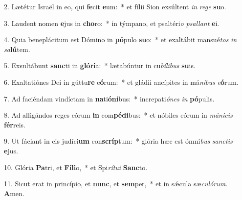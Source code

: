 2. Lætétur Israël in eo, qui \textbf{fe}cit \textbf{e}um:~*  et fílii Sion exsúltent \textit{in} \textit{re}\textit{ge} \textbf{su}o.\

3. Laudent nomen \textbf{e}jus in \textbf{cho}ro:~*  in týmpano, et psaltéri\textit{o} \textit{psal}\textit{lant} \textbf{e}i.\

4. Quia beneplácitum est Dómino in \textbf{pó}pulo \textbf{su}o:~*  et exaltábit mansué\textit{tos} \textit{in} \textit{sa}\textbf{lú}tem.\

5. Exsultábunt \textbf{sanc}ti in \textbf{gló}\textbf{ri}a:~*  lætabúntur in cu\textit{bí}\textit{li}\textit{bus} \textbf{su}is.\

6. Exaltatiónes Dei in gúttu\textbf{re} e\textbf{ó}rum:~*  et gládii ancípites in má\textit{ni}\textit{bus} \textit{e}\textbf{ó}rum.\

7. Ad faciéndam vindíctam in \textbf{na}ti\textbf{ó}\textbf{ni}bus:~*  increpati\textit{ó}\textit{nes} \textit{in} \textbf{pó}pulis.\

8. Ad alligándos reges eórum \textbf{in} com\textbf{pé}\textbf{di}bus:~*  et nóbiles eórum in \textit{má}\textit{ni}\textit{cis} \textbf{fér}reis.\

9. Ut fáciant in eis judíci\textbf{um} con\textbf{scríp}tum:~*  glória hæc est ómni\textit{bus} \textit{sanc}\textit{tis} \textbf{e}jus.\

10. Glória \textbf{Pa}tri, et \textbf{Fí}\textbf{li}o,~*  et Spi\textit{rí}\textit{tu}\textit{i} \textbf{Sanc}to.\

11. Sicut erat in princípio, et \textbf{nunc}, et \textbf{sem}per,~*  et in sǽcula sæ\textit{cu}\textit{ló}\textit{rum}. \textbf{A}men.\

